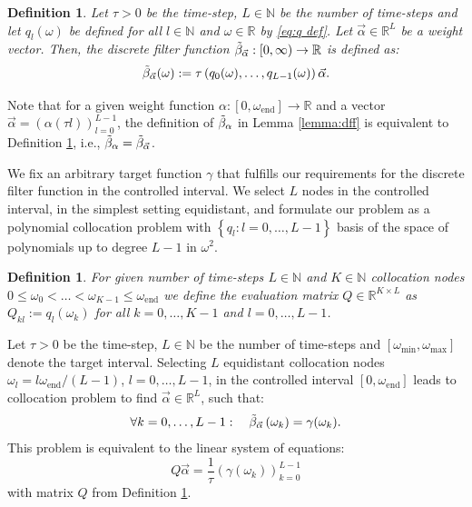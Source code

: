 \documentclass[a4paper,11pt,bibliography=totoc,listof=totoc,headinclude=true,cleardoublepage=empty,oneside]{scrbook}
\newtheorem{definition}[theorem]{Definition}
\newcommand{\R}{\mathbb{R}}
\newcommand{\N}{\mathbb{N}}
\newcommand{\dff}{\Tilde{\beta}_\alpha}
\newcommand{\dffv}{\Tilde{\beta}_{\Vec{\alpha}}}
\newcommand{\e}{\mathrm{end}}
\begin{document}
\begin{definition}\label{def:dffv}
    Let $\tau > 0$ be the time-step, $L\in \N$ be the number of time-steps and let $q_l(\omega)$ be defined for all $l \in \N$ and $\omega \in \R$ by \eqref{eq:q def}. Let $\Vec{\alpha}\in\R^L$ be a weight vector. Then, the discrete filter function $\dffv: [0, \infty) \rightarrow \R$ is defined as:
    \begin{equation}\label{eq:dffv}
        \dffv (\omega) := \tau \left(q_0(\omega), \dots, q_{L-1}(\omega)\right) \Vec{\alpha}. 
    \end{equation}
\end{definition}

Note that for a given weight function $\alpha: \left[0, \omega_\e\right] \rightarrow \R$ and a vector $\Vec{\alpha} = \left(\alpha(\tau l)\right)_{l=0}^{L-1}$, the definition of $\dff$ in Lemma \ref{lemma:dff} is equivalent to Definition \ref{def:dffv}, i.e., $\dff = \dffv$.

We fix an arbitrary target function $\gamma$ that fulfills our requirements for the discrete filter function in the controlled interval. We select $L$ nodes in the controlled interval, in the simplest setting equidistant, and formulate our problem as a polynomial collocation problem with $\left\{q_l : l=0, \dots, L-1\right\}$ basis of the space of polynomials up to degree $L-1$ in $\omega^2$.
\begin{definition}\label{def:evaluation matrix}
    For given number of time-steps $L\in \N$ and $K\in \N$ collocation nodes $ 0 \leqslant \omega_0 < \dots < \omega_{K-1} \leqslant \omega_\e$ we define the evaluation matrix $Q \in \R^{K\times L}$ as $Q_{kl} := q_l\left(\omega_k\right)$ for all $k=0, \dots, K-1$ and $l=0, \dots, L-1$. 
\end{definition}

Let $\tau>0$ be the time-step, $L\in \N$ be the number of time-steps and $\left[\omega_{\min}, \omega_{\max}\right]$ denote the target interval. Selecting $L$ equidistant collocation nodes $\omega_l = l\omega_\e/ (L-1)$, $l=0, \dots, L-1$, in the controlled interval $\left[0, \omega_{\e}\right]$ leads to collocation problem to find $\Vec{\alpha} \in \R^L$, such that:
\begin{equation*}
    \forall k = 0, \dots, L-1: \quad \dffv\left(\omega_k\right) = \gamma(\omega_k).
\end{equation*}
This problem is equivalent to the linear system of equations:
\begin{equation}\label{eq:alpha eq coll}
     Q \Vec{\alpha} = \frac{1}{\tau} \left(\gamma(\omega_k) \right)_{k=0}^{L-1}
\end{equation}
with matrix $Q$ from Definition \ref{def:evaluation matrix}.
\end{document}
